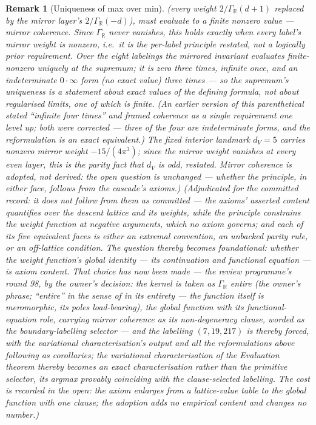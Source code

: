 \documentclass[11pt,a4paper]{article}
\newtheorem{remark}[theorem]{Remark}
\begin{document}
\begin{remark}[Uniqueness of max over min]
(every weight $2/\Gamma_{\mathbb{R}}(d+1)$ replaced by the mirror
layer's $2/\Gamma_{\mathbb{R}}(-d)$), must evaluate to a finite
nonzero value --- \emph{mirror coherence}. Since
$\Gamma_{\mathbb{R}}$ never vanishes, this holds exactly when every
label's mirror weight is nonzero, i.e.\ it is the per-label
principle restated, not a logically prior requirement. Over the
eight labelings the mirrored invariant evaluates finite-nonzero
uniquely at the supremum; it is zero three times, infinite once,
and an indeterminate $0\cdot\infty$ form (no exact value) three
times --- so the supremum's uniqueness is a statement about exact
values of the defining formula, not about regularised limits, one
of which is finite. (An earlier version of this parenthetical
stated ``infinite four times'' and framed coherence as a single
requirement one level up; both were corrected --- three of the four
are indeterminate forms, and the reformulation is an exact
equivalent.) The fixed interior landmark $d_V = 5$ carries nonzero
mirror weight $-15/(4\pi^3)$; since the mirror weight vanishes at
every even layer, this is the parity fact that $d_V$ is odd,
restated. Mirror coherence is adopted, not derived: the open
question is unchanged --- whether the principle, in either face,
follows from the cascade's axioms.) (Adjudicated for the committed
record: it does not follow from them as committed --- the axioms'
asserted content quantifies over the descent lattice and its
weights, while the principle constrains the weight function at
negative arguments, which no axiom governs; and each of its five
equivalent faces is either an extremal convention, an unbacked
parity rule, or an off-lattice condition. The question thereby
becomes foundational: whether the weight function's global
identity --- its continuation and functional equation --- is
axiom content. That choice has now been made --- the review
programme's round 98, by the owner's decision: the kernel is taken
as $\Gamma_{\mathbb{R}}$ \emph{entire} (the owner's phrase;
``entire'' in the sense of \emph{in its entirety} --- the function
itself is meromorphic, its poles load-bearing), the global function
with its functional-equation role, carrying mirror coherence as its
non-degeneracy clause, worded as the boundary-labelling
\emph{selector} --- and the labelling $(7,19,217)$ is thereby
forced, with the variational characterisation's output and all the
reformulations above following as corollaries; the variational
characterisation of the Evaluation theorem thereby becomes an exact
\emph{characterisation} rather than the primitive selector, its
argmax provably coinciding with the clause-selected labelling. The cost is recorded
in the open: the axiom enlarges from a lattice-value table to the
global function with one clause; the adoption adds no empirical
content and changes no number.)
\end{remark}
\end{document}
